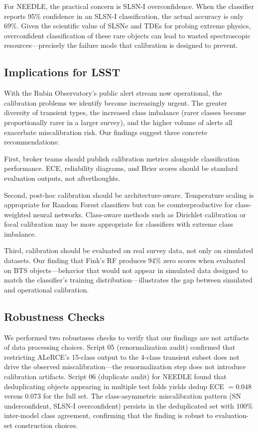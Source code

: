 \documentclass[twocolumn]{aastex631}
\begin{document}
For NEEDLE, the practical concern is SLSN-I overconfidence. When the classifier reports 95\% confidence in an SLSN-I classification, the actual accuracy is only 69\%. Given the scientific value of SLSNe and TDEs for probing extreme physics, overconfident classification of these rare objects can lead to wasted spectroscopic resources---precisely the failure mode that calibration is designed to prevent.

\subsection{Implications for LSST}

With the Rubin Observatory's public alert stream now operational, the calibration problems we identify become increasingly urgent. The greater diversity of transient types, the increased class imbalance (rarer classes become proportionally rarer in a larger survey), and the higher volume of alerts all exacerbate miscalibration risk. Our findings suggest three concrete recommendations:

First, broker teams should publish calibration metrics alongside classification performance. ECE, reliability diagrams, and Brier scores should be standard evaluation outputs, not afterthoughts.

Second, post-hoc calibration should be architecture-aware. Temperature scaling is appropriate for Random Forest classifiers but can be counterproductive for class-weighted neural networks. Class-aware methods such as Dirichlet calibration \citep{kull2019} or focal calibration \citep{mukhoti2020} may be more appropriate for classifiers with extreme class imbalance.

Third, calibration should be evaluated on real survey data, not only on simulated datasets. Our finding that Fink's RF produces 94\% zero scores when evaluated on BTS objects---behavior that would not appear in simulated data designed to match the classifier's training distribution---illustrates the gap between simulated and operational calibration.

\subsection{Robustness Checks}

We performed two robustness checks to verify that our findings are not artifacts of data processing choices. Script 05 (renormalization audit) confirmed that restricting ALeRCE's 15-class output to the 4-class transient subset does not drive the observed miscalibration---the renormalization step does not introduce calibration artifacts. Script 06 (duplicate audit) for NEEDLE found that deduplicating objects appearing in multiple test folds yields dedup ECE $= 0.048$ versus 0.073 for the full set. The class-asymmetric miscalibration pattern (SN underconfident, SLSN-I overconfident) persists in the deduplicated set with 100\% inter-model class agreement, confirming that the finding is robust to evaluation-set construction choices.
\end{document}
